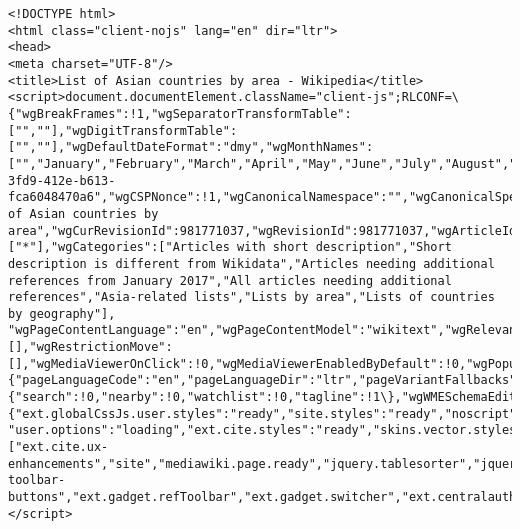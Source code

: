 \documentclass[11pt]{article}
\begin{document}
    \begin{Verbatim}[commandchars=\\\{\}]
<!DOCTYPE html>
<html class="client-nojs" lang="en" dir="ltr">
<head>
<meta charset="UTF-8"/>
<title>List of Asian countries by area - Wikipedia</title>
<script>document.documentElement.className="client-js";RLCONF=\{"wgBreakFrames":!1,"wgSeparatorTransformTable":["",""],"wgDigitTransformTable":["",""],"wgDefaultDateFormat":"dmy","wgMonthNames":["","January","February","March","April","May","June","July","August","September","October","November","December"],"wgRequestId":"c4479418-3fd9-412e-b613-fca6048470a6","wgCSPNonce":!1,"wgCanonicalNamespace":"","wgCanonicalSpecialPageName":!1,"wgNamespaceNumber":0,"wgPageName":"List\_of\_Asian\_countries\_by\_area","wgTitle":"List of Asian countries by area","wgCurRevisionId":981771037,"wgRevisionId":981771037,"wgArticleId":47659173,"wgIsArticle":!0,"wgIsRedirect":!1,"wgAction":"view","wgUserName":null,"wgUserGroups":["*"],"wgCategories":["Articles with short description","Short description is different from Wikidata","Articles needing additional references from January 2017","All articles needing additional references","Asia-related lists","Lists by area","Lists of countries by geography"],
"wgPageContentLanguage":"en","wgPageContentModel":"wikitext","wgRelevantPageName":"List\_of\_Asian\_countries\_by\_area","wgRelevantArticleId":47659173,"wgIsProbablyEditable":!0,"wgRelevantPageIsProbablyEditable":!0,"wgRestrictionEdit":[],"wgRestrictionMove":[],"wgMediaViewerOnClick":!0,"wgMediaViewerEnabledByDefault":!0,"wgPopupsReferencePreviews":!1,"wgPopupsConflictsWithNavPopupGadget":!1,"wgVisualEditor":\{"pageLanguageCode":"en","pageLanguageDir":"ltr","pageVariantFallbacks":"en"\},"wgMFDisplayWikibaseDescriptions":\{"search":!0,"nearby":!0,"watchlist":!0,"tagline":!1\},"wgWMESchemaEditAttemptStepOversample":!1,"wgULSCurrentAutonym":"English","wgNoticeProject":"wikipedia","wgCentralAuthMobileDomain":!1,"wgEditSubmitButtonLabelPublish":!0,"wgULSPosition":"interlanguage","wgWikibaseItemId":"Q20983969"\};RLSTATE=\{"ext.globalCssJs.user.styles":"ready","site.styles":"ready","noscript":"ready","user.styles":"ready","ext.globalCssJs.user":"ready","user":"ready",
"user.options":"loading","ext.cite.styles":"ready","skins.vector.styles.legacy":"ready","jquery.tablesorter.styles":"ready","jquery.makeCollapsible.styles":"ready","ext.visualEditor.desktopArticleTarget.noscript":"ready","ext.uls.interlanguage":"ready","ext.wikimediaBadges":"ready","wikibase.client.init":"ready"\};RLPAGEMODULES=["ext.cite.ux-enhancements","site","mediawiki.page.ready","jquery.tablesorter","jquery.makeCollapsible","skins.vector.legacy.js","ext.gadget.ReferenceTooltips","ext.gadget.charinsert","ext.gadget.extra-toolbar-buttons","ext.gadget.refToolbar","ext.gadget.switcher","ext.centralauth.centralautologin","mmv.head","mmv.bootstrap.autostart","ext.popups","ext.visualEditor.desktopArticleTarget.init","ext.visualEditor.targetLoader","ext.eventLogging","ext.wikimediaEvents","ext.navigationTiming","ext.uls.compactlinks","ext.uls.interface","ext.cx.eventlogging.campaigns","ext.quicksurveys.init","ext.centralNotice.geoIP","ext.centralNotice.startUp"];</script>

\end{Verbatim}
\end{document}
